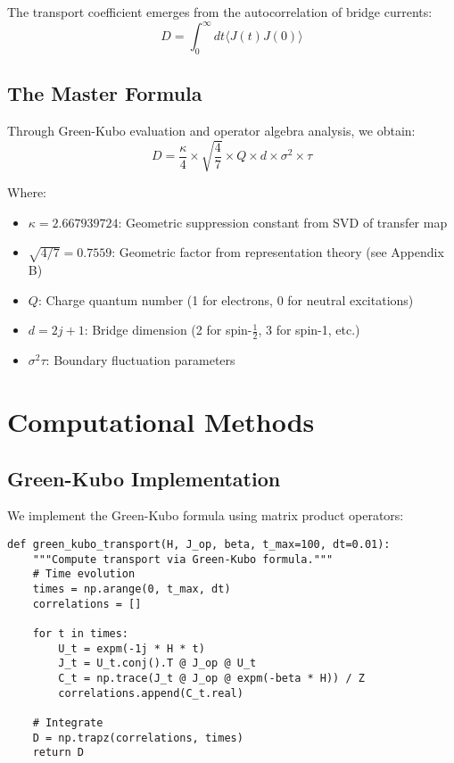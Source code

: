 \documentclass[12pt,letterpaper]{article}
\begin{document}
The transport coefficient emerges from the autocorrelation of bridge currents:
\begin{equation}
  D = \int_0^\infty dt \langle J(t) J(0) \rangle
\end{equation}

\subsection{The Master Formula}

Through Green-Kubo evaluation and operator algebra analysis, we obtain:
\begin{equation}
  \boxed{D = \frac{\kappa}{4} \times \sqrt{\frac{4}{7}} \times Q \times d \times \sigma^2 \times \tau}
\end{equation}

Where:
\begin{itemize}
  \item $\kappa = 2.667939724$: Geometric suppression constant from SVD of transfer map
  \item $\sqrt{4/7} = 0.7559$: Geometric factor from representation theory (see Appendix B)
  \item $Q$: Charge quantum number (1 for electrons, 0 for neutral excitations)
  \item $d = 2j + 1$: Bridge dimension (2 for spin-$\frac{1}{2}$, 3 for spin-1, etc.)
  \item $\sigma^2\tau$: Boundary fluctuation parameters
\end{itemize}

\section{Computational Methods}

\subsection{Green-Kubo Implementation}

We implement the Green-Kubo formula using matrix product operators:

\begin{lstlisting}
def green_kubo_transport(H, J_op, beta, t_max=100, dt=0.01):
    """Compute transport via Green-Kubo formula."""
    # Time evolution
    times = np.arange(0, t_max, dt)
    correlations = []

    for t in times:
        U_t = expm(-1j * H * t)
        J_t = U_t.conj().T @ J_op @ U_t
        C_t = np.trace(J_t @ J_op @ expm(-beta * H)) / Z
        correlations.append(C_t.real)

    # Integrate
    D = np.trapz(correlations, times)
    return D
\end{lstlisting}
\end{document}

